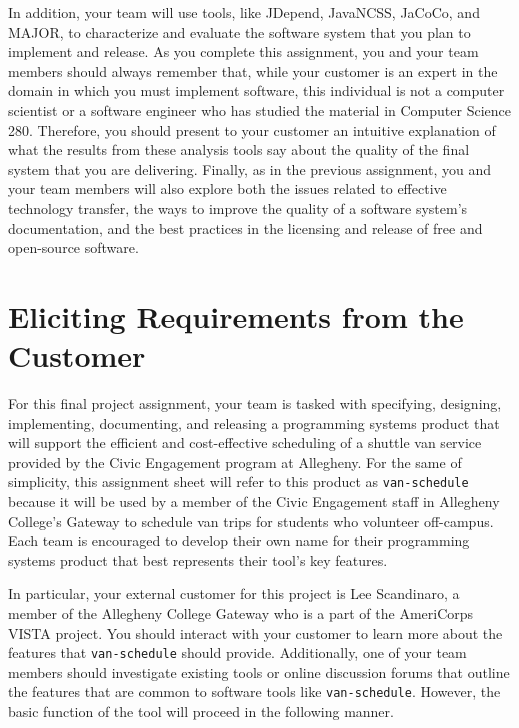 In addition, your team will use tools, like JDepend, JavaNCSS, JaCoCo, and MAJOR, to characterize and evaluate the
software system that you plan to implement and release.  As you complete this assignment, you and your team members
should always remember that, while your customer is an expert in the domain in which you must implement software, this
individual is not a computer scientist or a software engineer who has studied the material in Computer Science 280.
Therefore, you should present to your customer an intuitive explanation of what the results from these analysis tools say
about the quality of the final system that you are delivering.  Finally, as in the previous assignment, you and your
team members will also explore both the issues related to effective technology transfer, the ways to improve the quality
of a software system's documentation, and the best practices in the licensing and release of free and open-source
software.

\section*{Eliciting Requirements from the Customer}

For this final project assignment, your team is tasked with specifying, designing, implementing, documenting, and
releasing a programming systems product that will support the efficient and cost-effective scheduling of a shuttle van
service provided by the Civic Engagement program at Allegheny.  For the same of simplicity, this assignment sheet will
refer to this product as {\tt van-schedule} because it will be used by a member of the Civic Engagement staff in
Allegheny College's Gateway to schedule van trips for students who volunteer off-campus. Each team is encouraged to
develop their own name for their programming systems product that best represents their tool's key features.


In particular, your external customer for this project is Lee Scandinaro, a member of the Allegheny College Gateway who
is a part of the AmeriCorps VISTA project. You should interact with your customer to learn more about the features that
{\tt van-schedule} should provide.  Additionally, one of your team members should investigate existing tools or online
discussion forums that outline the features that are common to software tools like {\tt van-schedule}. However, the
basic function of the tool will proceed in the following manner.

